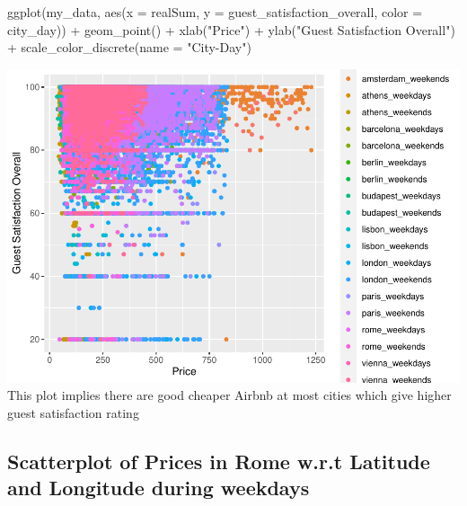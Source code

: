 \documentclass[
]{article}
\newenvironment{Shaded}{\begin{snugshade}}{\end{snugshade}}
\newcommand{\AttributeTok}[1]{\textcolor[rgb]{0.77,0.63,0.00}{#1}}
\newcommand{\FunctionTok}[1]{\textcolor[rgb]{0.00,0.00,0.00}{#1}}
\newcommand{\NormalTok}[1]{#1}
\newcommand{\SpecialCharTok}[1]{\textcolor[rgb]{0.00,0.00,0.00}{#1}}
\newcommand{\StringTok}[1]{\textcolor[rgb]{0.31,0.60,0.02}{#1}}
\begin{document}
\begin{Shaded}
\begin{Highlighting}[]
\FunctionTok{ggplot}\NormalTok{(my\_data, }\FunctionTok{aes}\NormalTok{(}\AttributeTok{x =}\NormalTok{ realSum, }\AttributeTok{y =}\NormalTok{ guest\_satisfaction\_overall,}
    \AttributeTok{color =}\NormalTok{ city\_day)) }\SpecialCharTok{+} \FunctionTok{geom\_point}\NormalTok{() }\SpecialCharTok{+} \FunctionTok{xlab}\NormalTok{(}\StringTok{"Price"}\NormalTok{) }\SpecialCharTok{+} \FunctionTok{ylab}\NormalTok{(}\StringTok{"Guest Satisfaction Overall"}\NormalTok{) }\SpecialCharTok{+}
    \FunctionTok{scale\_color\_discrete}\NormalTok{(}\AttributeTok{name =} \StringTok{"City{-}Day"}\NormalTok{)}
\end{Highlighting}
\end{Shaded}

\includegraphics{Project_Prelim_report_files/figure-latex/unnamed-chunk-7-1.pdf}
This plot implies there are good cheaper Airbnb at most cities which
give higher guest satisfaction rating

\hypertarget{scatterplot-of-prices-in-rome-w.r.t-latitude-and-longitude-during-weekdays}{%
\subsection{Scatterplot of Prices in Rome w.r.t Latitude and Longitude
during
weekdays}\label{scatterplot-of-prices-in-rome-w.r.t-latitude-and-longitude-during-weekdays}}
\end{document}
